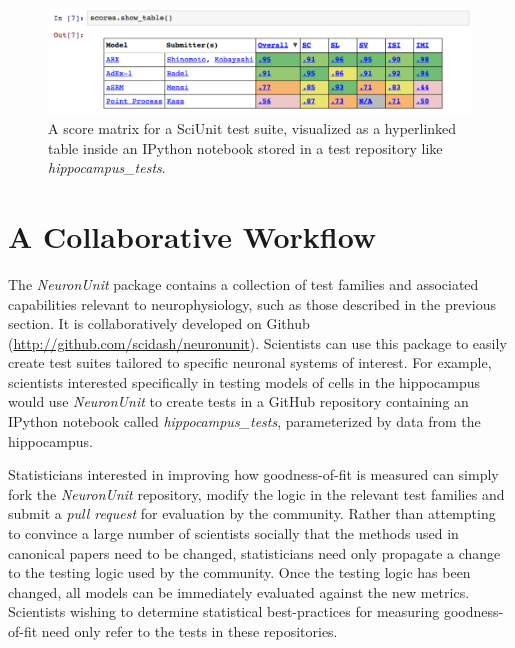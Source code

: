 \documentclass{frontiersSCNS}
\begin{document}
\begin{figure}%
\centering
\includegraphics[scale=0.55]{table-ipy.pdf}
\vspace{-10px}
\caption{A score matrix for a SciUnit test suite, visualized as a hyperlinked table inside an IPython notebook stored in a test repository like \textit{hippocampus\_tests}.}
\label{fig:scidash_matrix}
\vspace{5px}
\end{figure}

\section{A Collaborative Workflow}\label{sec:neuronunit_acitivities}
The \textit{NeuronUnit} package contains a collection of test families and associated capabilities relevant to neurophysiology, such as those described in the previous section. 
It is collaboratively developed on Github (\url{http://github.com/scidash/neuronunit}). 
Scientists can use this package to easily create test suites tailored to specific neuronal systems of interest. 
For example, scientists interested specifically in testing models of cells in the hippocampus would use \textit{NeuronUnit} to create tests in a GitHub repository containing an IPython notebook called \textit{hippocampus\_tests}, parameterized by data from the hippocampus.%

Statisticians interested in improving how goodness-of-fit is measured can simply fork the \textit{NeuronUnit} repository, modify the logic in the relevant test families and submit a \emph{pull request} for evaluation by the community. 
Rather than attempting to convince a large number of scientists socially that the methods used in canonical papers need to be changed, statisticians need only propagate a change to the testing logic used by the community. 
Once the testing logic has been changed, all models can be immediately evaluated against the new metrics. 
Scientists wishing to determine statistical best-practices for measuring goodness-of-fit need only refer to the tests in these repositories.
\end{document}
